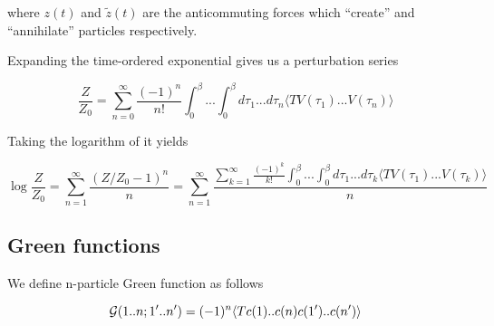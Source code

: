 where $z(t)$ and $\tilde{z}(t)$ are the anticommuting forces which ``create'' and ``annihilate'' particles respectively.

Expanding the time-ordered exponential gives us a perturbation series

\[ \frac{Z}{Z_0} = \sum_{n=0}^{\infty}\frac{(-1)^n}{n!}\int_{0}^{\beta}...\int_{0}^{\beta} d\tau_1...d\tau_n 
    \langle T V(\tau_1)...V(\tau_n) \rangle \]

Taking the logarithm of it yields

\[ \log{\frac{Z}{Z_0}} = \sum_{n=1}^{\infty}\frac{(Z/Z_0-1)^n}{n} = \sum_{n=1}^{\infty}
  \frac{\sum_{k=1}^{\infty}\frac{(-1)^k}{k!}\int_{0}^{\beta}...\int_{0}^{\beta} d\tau_1...d\tau_k 
    \langle T V(\tau_1)...V(\tau_k) \rangle}{n} \]

\subsection{Green functions}
We define n-particle Green function as follows

\[ \mathcal{G}(1..n;1'..n') = (-1)^n\langle T c(1)..c(n)c(1')..c(n')\rangle \]

